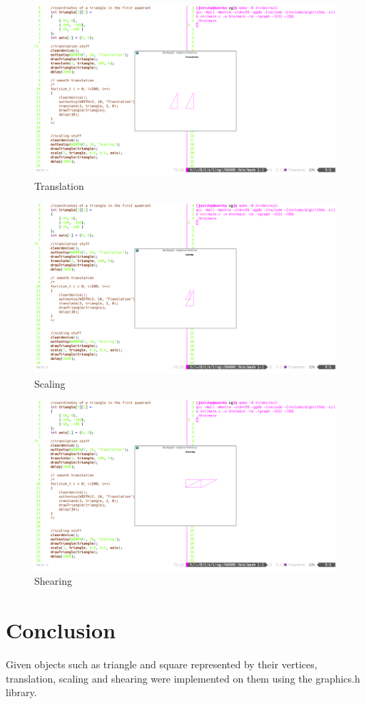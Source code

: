 \documentclass[12pt]{article}
\begin{document}
	\begin{figure}[!ht]
		\hspace*{-1cm}
		\centering
		\includegraphics[width=1.01\linewidth]{translation.png}
		\caption{Translation}
		\label{fig: Translation}
	\end{figure}
	\begin{figure}[!ht]
		\hspace*{-1cm}
		\centering
		\includegraphics[width=1.01\linewidth]{scaling.png}
		\caption{Scaling}
		\label{fig: Scaling}
	\end{figure}
	\begin{figure}[!ht]
		\hspace*{-1cm}
		\centering
		\includegraphics[width=1.01\linewidth]{shearing.png}
		\caption{Shearing}
		\label{fig: Shearing}
	\end{figure}

	\section{Conclusion}
	Given objects such as triangle and square represented by their vertices, translation, scaling and shearing were implemented on them using the graphics.h library.
\end{document}
